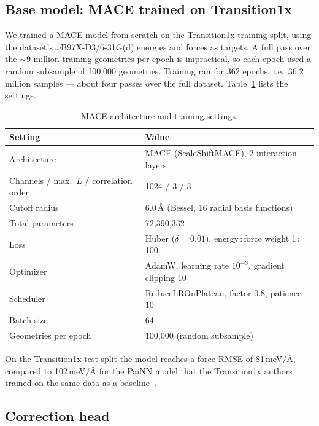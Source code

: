 \subsection{Base model: MACE trained on Transition1x}
\label{sec:mace-training}

We trained a MACE model from scratch on the Transition1x training split, using
the dataset's \mbox{$\omega$B97X-D3/6-31G(d)} energies and forces as targets. A full pass over the ${\sim}9$ million training geometries per epoch is impractical,
so each epoch used a random subsample of 100{,}000 geometries. Training ran for
362 epochs, i.e.\ 36.2 million samples --- about four passes over the full
dataset. Table~\ref{tab:mace-settings} lists the settings.

\begin{table}[htbp]
  \centering
  \caption{MACE architecture and training settings.}
  \label{tab:mace-settings}
  \begin{tabular}{ll}
    \toprule
    Setting & Value \\
    \midrule
    Architecture & MACE (ScaleShiftMACE), 2 interaction layers \\
    Channels / max.\ $L$ / correlation order & 1024 / 3 / 3 \\
    Cutoff radius & 6.0\,\AA{} (Bessel, 16 radial basis functions) \\
    Total parameters & 72{,}390{,}332 \\
    Loss & Huber ($\delta = 0.01$), energy\,:\,force weight 1\,:\,100 \\
    Optimizer & AdamW, learning rate $10^{-3}$, gradient clipping 10 \\
    Scheduler & ReduceLROnPlateau, factor 0.8, patience 10 \\
    Batch size & 64 \\
    Geometries per epoch & 100{,}000 (random subsample) \\
    \bottomrule
  \end{tabular}
\end{table}

On the Transition1x test split the model reaches a force RMSE of
81\,meV/\AA, compared to 102\,meV/\AA{} for the PaiNN model that the
Transition1x authors trained on the same data as a
baseline~\cite{Schreiner2022}. 

\subsection{Correction head}
\label{sec:delta-architecture}

